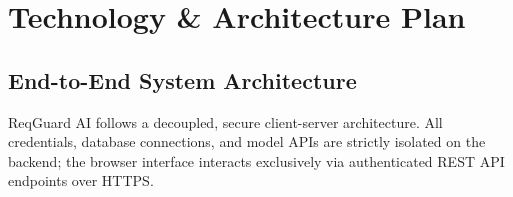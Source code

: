\documentclass[11pt,a4paper]{article}
\begin{document}
\section{Technology \& Architecture Plan}

\subsection{End-to-End System Architecture}
ReqGuard AI follows a decoupled, secure client-server architecture. All credentials, database connections, and model APIs are strictly isolated on the backend; the browser interface interacts exclusively via authenticated REST API endpoints over HTTPS.
\end{document}
